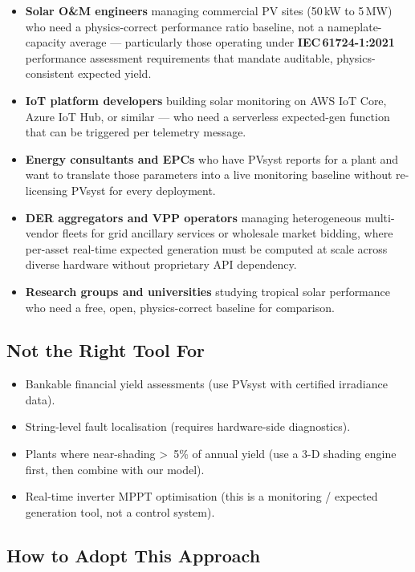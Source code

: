 \documentclass[11pt, a4paper]{article}
\begin{document}
\begin{itemize}
  \item \textbf{Solar O\&M engineers} managing commercial PV sites (50\,kW
    to 5\,MW) who need a physics-correct performance ratio baseline, not a
    nameplate-capacity average --- particularly those operating under
    \textbf{IEC\,61724-1:2021} performance assessment requirements that
    mandate auditable, physics-consistent expected yield.
  \item \textbf{IoT platform developers} building solar monitoring on AWS
    IoT Core, Azure IoT Hub, or similar --- who need a serverless expected-gen
    function that can be triggered per telemetry message.
  \item \textbf{Energy consultants and EPCs} who have PVsyst reports for a plant
    and want to translate those parameters into a live monitoring baseline without
    re-licensing PVsyst for every deployment.
  \item \textbf{DER aggregators and VPP operators} managing heterogeneous
    multi-vendor fleets for grid ancillary services or wholesale market bidding,
    where per-asset real-time expected generation must be computed at scale
    across diverse hardware without proprietary API dependency.
  \item \textbf{Research groups and universities} studying tropical solar
    performance who need a free, open, physics-correct baseline for comparison.
\end{itemize}

\subsection{Not the Right Tool For}

\begin{itemize}
  \item Bankable financial yield assessments (use PVsyst with certified
    irradiance data).
  \item String-level fault localisation (requires hardware-side diagnostics).
  \item Plants where near-shading \textgreater\ 5\% of annual yield (use a
    3-D shading engine first, then combine with our model).
  \item Real-time inverter MPPT optimisation (this is a monitoring / expected
    generation tool, not a control system).
\end{itemize}

\subsection{How to Adopt This Approach}
\end{document}
